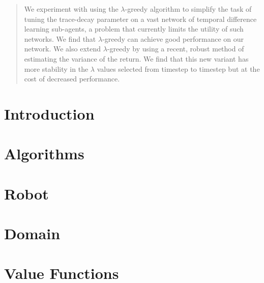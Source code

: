 \documentclass[english]{article}
\begin{document}

\printAffiliationsAndNotice{}

\begin{abstract}
    We experiment with using the {$\lambda$}-greedy algorithm to simplify the task of tuning the trace-decay parameter on a vast network of temporal difference learning sub-agents, a problem that currently limits the utility of such networks. We find that {$\lambda$}-greedy can achieve good performance on our network. We also extend {$\lambda$}-greedy by using a recent, robust method of estimating the variance of the return. We find that this new variant has more stability in the $\lambda$ values selected from timestep to timestep but at the cost of decreased performance.
\end{abstract}

\section{Introduction}
\label{sec:introduction}


\section{Algorithms}
\label{sec:algorithms}


\section{Robot}
\label{sec:robot}


\section{Domain}
\label{sec:domain}


\section{Value Functions}
\label{sec:value_functions}

\end{document}
